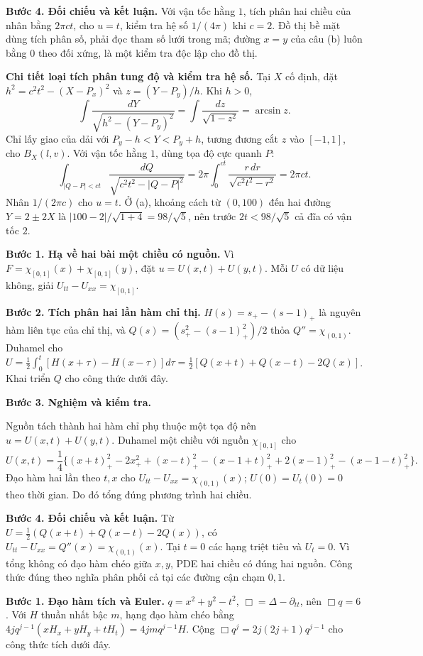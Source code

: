 \textbf{Bước 4. Đối chiếu và kết luận.} Với vận tốc hằng $1$, tích phân hai chiều của nhân bằng $2\pi ct$, cho $u=t$, kiểm tra hệ số $1/(4\pi)$ khi $c=2$. Đồ thị bề mặt dùng tích phân số, phải đọc tham số lưới trong mã; đường $x=y$ của câu (b) luôn bằng $0$ theo đối xứng, là một kiểm tra độc lập cho đồ thị.

\textbf{Chi tiết loại tích phân tung độ và kiểm tra hệ số.} Tại $X$ cố định, đặt $h^2=c^2t^2-(X-P_x)^2$ và $z=(Y-P_y)/h$. Khi $h>0$,
\[\int\frac{dY}{\sqrt{h^2-(Y-P_y)^2}}
=\int\frac{dz}{\sqrt{1-z^2}}=\arcsin z.\]
Chỉ lấy giao của dải với $P_y-h<Y<P_y+h$, tương đương cắt $z$ vào $[-1,1]$, cho $B_X(l,v)$. Với vận tốc hằng $1$, dùng tọa độ cực quanh $P$:
\[\int_{|Q-P|<ct}\frac{dQ}{\sqrt{c^2t^2-|Q-P|^2}}
=2\pi\int_0^{ct}\frac{r\,dr}{\sqrt{c^2t^2-r^2}}
=2\pi ct.\]
Nhân $1/(2\pi c)$ cho $u=t$. Ở (a), khoảng cách từ $(0,100)$ đến hai đường $Y=2\pm2X$ là $|100-2|/\sqrt{1+4}=98/\sqrt5$, nên trước $2t<98/\sqrt5$ cả đĩa có vận tốc $2$.

\textbf{Bước 1. Hạ về hai bài một chiều có nguồn.} Vì $F=\chi_{[0,1]}(x)+\chi_{[0,1]}(y)$, đặt $u=U(x,t)+U(y,t)$. Mỗi $U$ có dữ liệu không, giải $U_{tt}-U_{xx}=\chi_{[0,1]}$.

\textbf{Bước 2. Tích phân hai lần hàm chỉ thị.} $H(s)=s_+-(s-1)_+$ là nguyên hàm liên tục của chỉ thị, và $Q(s)=(s_+^2-(s-1)_+^2)/2$ thỏa $Q''=\chi_{(0,1)}$. Duhamel cho $U=\frac12\int_0^t[H(x+\tau)-H(x-\tau)]d\tau=\frac12[Q(x+t)+Q(x-t)-2Q(x)]$. Khai triển $Q$ cho công thức dưới đây.

\textbf{Bước 3. Nghiệm và kiểm tra.}

Nguồn tách thành hai hàm chỉ phụ thuộc một tọa độ nên $u=U(x,t)+U(y,t)$. Duhamel một chiều với nguồn $\chi_{[0,1]}$ cho
\[U(x,t)=\frac14\{(x+t)_+^2-2x_+^2+(x-t)_+^2-(x-1+t)_+^2+2(x-1)_+^2-(x-1-t)_+^2\}.\]
Đạo hàm hai lần theo $t,x$ cho $U_{tt}-U_{xx}=\chi_{(0,1)}(x)$; $U(0)=U_t(0)=0$ theo thời gian. Do đó tổng đúng phương trình hai chiều.

\textbf{Bước 4. Đối chiếu và kết luận.} Từ $U=\frac12(Q(x+t)+Q(x-t)-2Q(x))$, có $U_{tt}-U_{xx}=Q''(x)=\chi_{(0,1)}(x)$. Tại $t=0$ các hạng triệt tiêu và $U_t=0$. Vì tổng không có đạo hàm chéo giữa $x,y$, PDE hai chiều có đúng hai nguồn. Công thức đúng theo nghĩa phân phối cả tại các đường cận chạm $0,1$.

\textbf{Bước 1. Đạo hàm tích và Euler.} $q=x^2+y^2-t^2$, $\Box=\Delta-\partial_{tt}$, nên $\Box q=6$. Với $H$ thuần nhất bậc $m$, hạng đạo hàm chéo bằng $4j q^{j-1}(xH_x+yH_y+tH_t)=4jm q^{j-1}H$. Cộng $\Box q^j=2j(2j+1)q^{j-1}$ cho công thức tích dưới đây.

